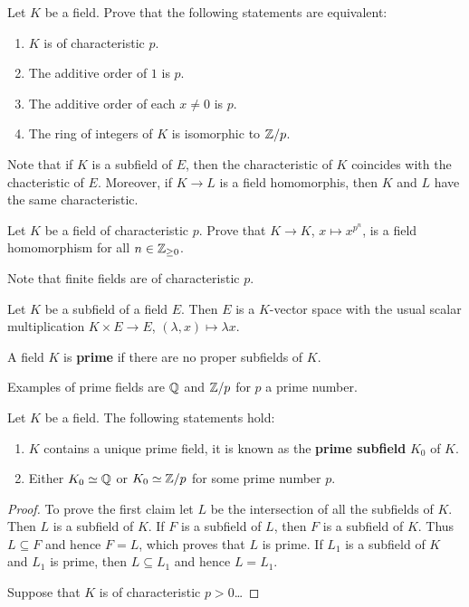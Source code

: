 \begin{exercise}
	Let $K$ be a field. Prove that
	the following statements are equivalent:
	\begin{enumerate}
		\item $K$ is of characteristic $p$.
		\item The additive order of $1$ is $p$. 
		\item The additive order of each $x\ne0$ is $p$.
		\item The ring of integers of $K$ is isomorphic to $\mathbb{Z}/p$.
	\end{enumerate}
\end{exercise}

Note that if $K$ is a subfield of $E$, then
the characteristic of $K$ coincides
with the chacteristic 
of $E$. Moreover, if $K\to L$ is a field homomorphis, then
$K$ and $L$ have the same characteristic. 

\begin{exercise}
	Let $K$ be a field of characteristic $p$. Prove
	that $K\to K$, $x\mapsto x^{p^n}$, is a field homomorphism
	for all $n\in\mathbb{Z}_{\geq 0}$. 
\end{exercise}

Note that finite fields are of characteristic $p$. 

Let $K$ be a subfield of a field $E$. Then $E$ 
is a $K$-vector space with the usual scalar multiplication
$K\times E\to E$, 
$(\lambda, x)\mapsto \lambda x$.

\begin{definition}
	A field $K$ is \textbf{prime} if there are no
	proper subfields of $K$. 
\end{definition}

Examples of prime fields are $\mathbb{Q}$ and $\mathbb{Z}/p$ for $p$ a prime number.

\begin{proposition}
	Let $K$ be a field. The following statements hold:
	\begin{enumerate}
		\item $K$ contains a unique prime field, it is known as the 
			\textbf{prime subfield} $K_0$ of $K$.
		\item Either $K_0\simeq\mathbb{Q}$ or $K_0\simeq\mathbb{Z}/p$ for 
			some prime number $p$.
	\end{enumerate}
\end{proposition}

\begin{proof}
	To prove the first claim let $L$ be the intersection
	of all the subfields of $K$. Then $L$ is a subfield of $K$. 
	If $F$ is a subfield of $L$, then $F$ is a subfield
	of $K$. Thus $L\subseteq F$ and hence $F=L$, which proves
	that $L$ is prime. If $L_1$ is a subfield of $K$
	and $L_1$ is prime, then $L\subseteq L_1$ and 
	hence $L=L_1$. 

	Suppose that $K$ is of characteristic $p>0$\ldots
\end{proof}

